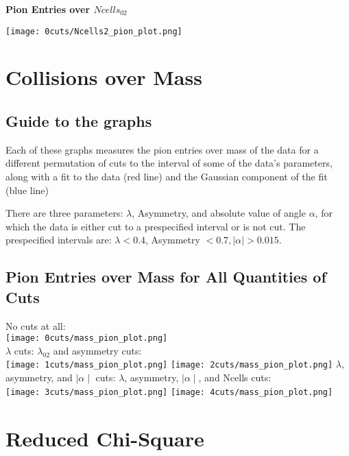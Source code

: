 \documentclass[11pt]{article}
\begin{document}
\begin{frame}{} %
\centering
\textbf{Pion Entries over $Ncells_{02}$}\par\medskip
\texttt{[image: 0cuts/Ncells2\_pion\_plot.png]}
\end{frame}

\section{Collisions over Mass}
\subsection{Guide to the graphs} %
Each of these graphs measures the pion entries over mass of the data for a different permutation of cuts to the interval of some of the data's parameters, along with a fit to the data (red line) and the Gaussian component of the fit (blue line)

There are three parameters: $\lambda$, Asymmetry, and absolute value of angle $\alpha$, for which the data is either cut to a prespecified interval or is not cut. The prespecified intervals are: $\lambda < 0.4$, Asymmetry $< 0.7, \mid\alpha\mid > 0.015 $.
\subsection{Pion Entries over Mass for All Quantities of Cuts} %
\begin{frame}{}
No cuts at all:\\
\texttt{[image: 0cuts/mass\_pion\_plot.png]}\\
$\lambda$ cuts: 
\noindent\hspace{3 cm} $\lambda_{02}$ and asymmetry cuts: \\
\texttt{[image: 1cuts/mass\_pion\_plot.png]}
\texttt{[image: 2cuts/mass\_pion\_plot.png]}
$\lambda$, asymmetry, and $\mid\alpha\mid$ cuts:
\noindent\hspace{4 cm} $\lambda$, asymmetry, $\mid\alpha\mid$, and Ncells cuts:\\
\texttt{[image: 3cuts/mass\_pion\_plot.png]}
\texttt{[image: 4cuts/mass\_pion\_plot.png]}
\end{frame}

\section{Reduced Chi-Square}
\end{document}
